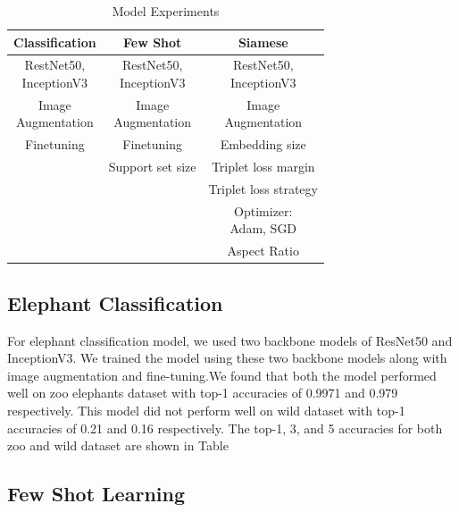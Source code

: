 \documentclass[10pt,twocolumn,letterpaper]{article}
\begin{document}
\begin{table}[h!]
  \begin{center}
    \begin{tabular}{ c | c | c} 
      \textbf{Classification} & \textbf{Few Shot} & \textbf{Siamese}\\
      \hline
      \makecell{RestNet50,  \\ InceptionV3} & \makecell{ RestNet50, \\ InceptionV3} & \makecell{RestNet50, \\ InceptionV3 }\\
       \hline
      \makecell{Image \\ Augmentation}  & \makecell{Image \\Augmentation} & \makecell{Image \\ Augmentation}\\
      \hline
      Finetuning  & Finetuning & Embedding size\\
      \hline
        & Support set size & Triplet loss margin\\
     \hline
     	& & Triplet loss strategy\\
     \hline
	& & \makecell{Optimizer: \\ Adam, SGD}\\
     \hline
      	& & Aspect Ratio\\
    \end{tabular}
  \caption{Model Experiments}
  \label{tab:exp}
  \end{center}
\end{table}

\subsection{Elephant Classification}

For elephant classification model, we used two backbone models of ResNet50 and InceptionV3. We trained the model using these two backbone models along with image augmentation and fine-tuning.We found that both the model performed well on zoo elephants dataset with top-1 accuracies of 0.9971 and 0.979 respectively. This model did not perform well on wild dataset with top-1 accuracies of 0.21 and 0.16 respectively. The top-1, 3, and 5 accuracies for both zoo and wild dataset are shown in Table 


\subsection{Few Shot Learning}
\end{document}
